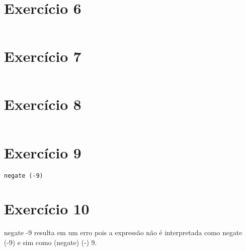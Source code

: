\documentclass[12pt,a4paper,brazil]{article}
\begin{document}
\section*{Exercício 6}
\begin{lstlisting}
\end{lstlisting}

\section*{Exercício 7}
\begin{lstlisting}
\end{lstlisting}

\section*{Exercício 8}
\begin{lstlisting}
\end{lstlisting}

\section*{Exercício 9}
\begin{lstlisting}
negate (-9)
\end{lstlisting}

\section*{Exercício 10}
negate -9 resulta em um erro pois a expressão não é interpretada como negate (-9) e sim como (negate) (-) 9.
\end{document}
